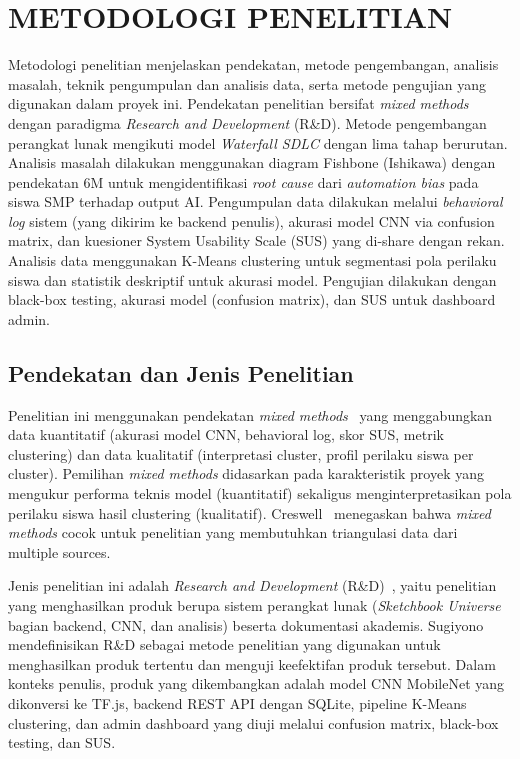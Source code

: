 \documentclass[12pt,a4paper,oneside,openany]{report}
\begin{document}
\section{METODOLOGI PENELITIAN}
\label{sec:metodologi-penelitian}

Metodologi penelitian menjelaskan pendekatan, metode pengembangan, analisis masalah, teknik pengumpulan dan analisis data, serta metode pengujian yang digunakan dalam proyek ini. Pendekatan penelitian bersifat \textit{mixed methods} dengan paradigma \textit{Research and Development} (R\&D). Metode pengembangan perangkat lunak mengikuti model \textit{Waterfall SDLC} dengan lima tahap berurutan. Analisis masalah dilakukan menggunakan diagram Fishbone (Ishikawa) dengan pendekatan 6M untuk mengidentifikasi \textit{root cause} dari \textit{automation bias} pada siswa SMP terhadap output AI. Pengumpulan data dilakukan melalui \textit{behavioral log} sistem (yang dikirim ke backend penulis), akurasi model CNN via confusion matrix, dan kuesioner System Usability Scale (SUS) yang di-share dengan rekan. Analisis data menggunakan K-Means clustering untuk segmentasi pola perilaku siswa dan statistik deskriptif untuk akurasi model. Pengujian dilakukan dengan black-box testing, akurasi model (confusion matrix), dan SUS untuk dashboard admin.

\subsection{Pendekatan dan Jenis Penelitian}
\label{subsec:pendekatan-penelitian}

Penelitian ini menggunakan pendekatan \textit{mixed methods}~\cite{ref13} yang menggabungkan data kuantitatif (akurasi model CNN, behavioral log, skor SUS, metrik clustering) dan data kualitatif (interpretasi cluster, profil perilaku siswa per cluster). Pemilihan \textit{mixed methods} didasarkan pada karakteristik proyek yang mengukur performa teknis model (kuantitatif) sekaligus menginterpretasikan pola perilaku siswa hasil clustering (kualitatif). Creswell~\cite{ref13} menegaskan bahwa \textit{mixed methods} cocok untuk penelitian yang membutuhkan triangulasi data dari multiple sources.

Jenis penelitian ini adalah \textit{Research and Development} (R\&D)~\cite{ref12}, yaitu penelitian yang menghasilkan produk berupa sistem perangkat lunak (\textit{Sketchbook Universe} bagian backend, CNN, dan analisis) beserta dokumentasi akademis. Sugiyono~\cite{ref12} mendefinisikan R\&D sebagai metode penelitian yang digunakan untuk menghasilkan produk tertentu dan menguji keefektifan produk tersebut. Dalam konteks penulis, produk yang dikembangkan adalah model CNN MobileNet yang dikonversi ke TF.js, backend REST API dengan SQLite, pipeline K-Means clustering, dan admin dashboard yang diuji melalui confusion matrix, black-box testing, dan SUS.
\end{document}

